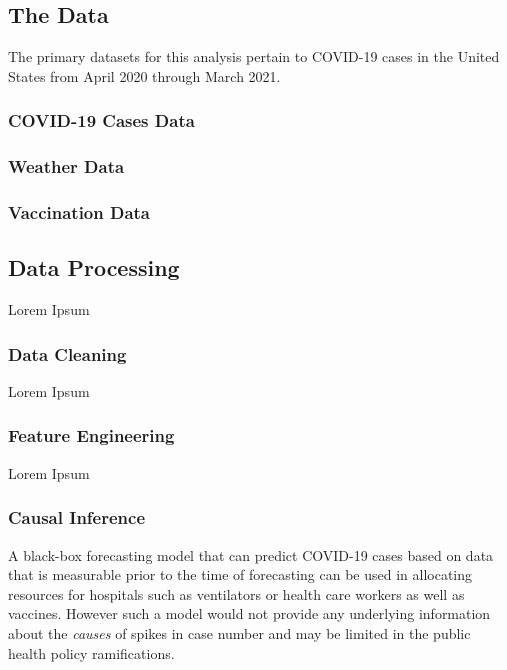 \documentclass[11pt]{article}
\begin{document}
\subsection{The Data}

The primary datasets for this analysis pertain to COVID-19 cases in the United States from April 2020 through March 2021.  

\subsubsection{COVID-19 Cases Data}


\subsubsection{Weather Data}

\subsubsection{Vaccination Data}



\subsection{Data Processing}
Lorem Ipsum 

\subsubsection{Data Cleaning}
Lorem Ipsum 

\subsubsection{Feature Engineering}
Lorem Ipsum 


\subsubsection{Causal Inference}

A black-box forecasting model that can predict COVID-19 cases based on data that is measurable prior to the time of forecasting can be used in allocating resources for hospitals such as ventilators or health care workers as well as vaccines. However such a model would not provide any underlying information about the \textit{causes} of spikes in case number and may be limited in the public health policy ramifications. 
\end{document}
